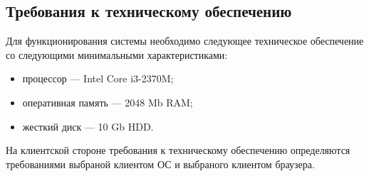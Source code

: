 \subsection{Требования к техническому обеспечению}


Для функционирования системы необходимо следующее техническое обеспечение со следующими минимальными характеристиками:
\begin{itemize}
\item процессор --– Intel Core i3-2370M;
\item оперативная память --– 2048 Mb RAM;
\item жесткий диск --- 10 Gb HDD.
\end{itemize}

На клиентской стороне требования к техническому обеспечению определяются требованиями выбраной клиентом ОС и выбраного клиентом браузера.
